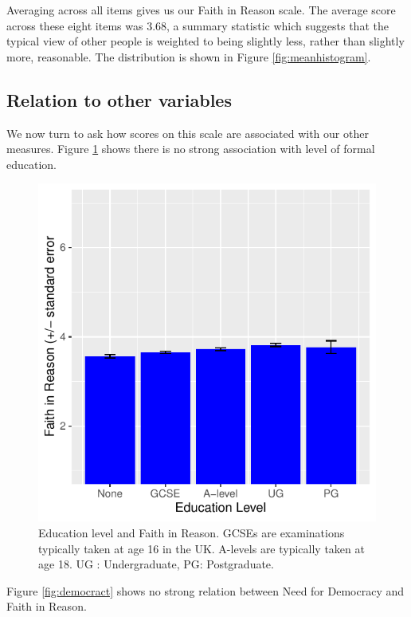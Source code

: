 \documentclass[
  ,jou,floatsintext]{apa6}
\begin{document}
Averaging across all items gives us our Faith in Reason scale. The average score across these eight items was 3.68, a summary statistic which suggests that the typical view of other people is weighted to being slightly less, rather than slightly more, reasonable. The distribution is shown in Figure \ref{fig:meanhistogram}.

\hypertarget{relation-to-other-variables}{%
\subsection{Relation to other variables}\label{relation-to-other-variables}}

We now turn to ask how scores on this scale are associated with our other measures. Figure \ref{fig:education} shows there is no strong association with level of formal education.

\begin{figure}

{\centering \includegraphics[width=0.75\linewidth]{faithinreason_files/figure-latex/education-1} 

}

\caption{Education level and Faith in Reason. GCSEs are examinations typically taken at age 16 in the UK. A-levels are typically taken at age 18. UG : Undergraduate, PG: Postgraduate.}\label{fig:education}
\end{figure}

Figure \ref{fig:democract} shows no strong relation between Need for Democracy and Faith in Reason.
\end{document}
